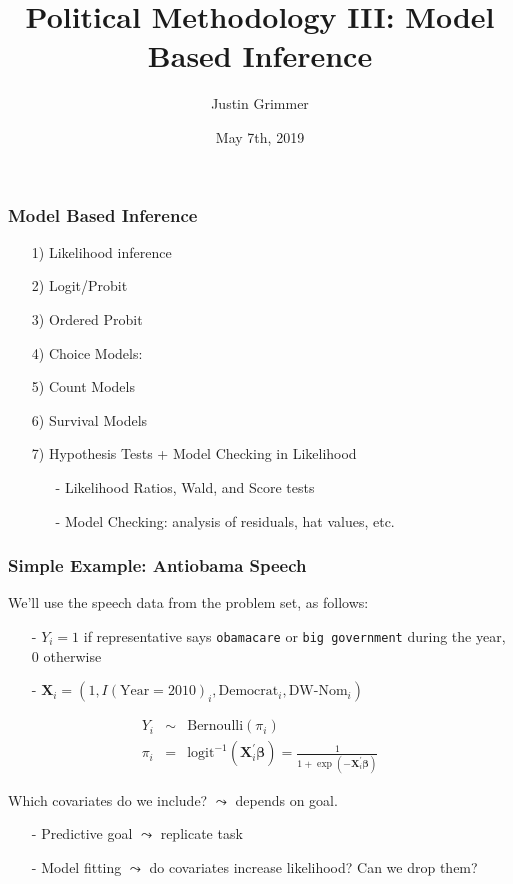 \documentclass{beamer}
\title[Methodology III] %
{Political Methodology III: Model Based Inference}
\author{Justin Grimmer}
\institute[Stanford University]{Professor\\Department of Political Science \\  Stanford University}
\date{May 7th, 2019}
\begin{document}
\begin{frame}
\titlepage
\end{frame}


\begin{frame}
\frametitle{Model Based Inference}

\begin{itemize}
\item[1)] Likelihood inference
\item[2)] Logit/Probit
\item[3)] Ordered Probit
\item[4)] Choice Models:
\item[5)] Count Models
\item[6)] Survival Models
\item[7)] \alert{Hypothesis Tests + Model Checking in Likelihood}
\begin{itemize}
\item[-] Likelihood Ratios, Wald, and Score tests
\item[-] Model Checking: analysis of residuals, hat values, etc.
\end{itemize}
\end{itemize}

\end{frame}


\begin{frame}
\frametitle{Simple Example: Antiobama Speech}

We'll  use the speech data from the problem set, as follows:

\begin{itemize}
\item[-] $Y_{i} = 1 $ if representative says {\tt obamacare} or {\tt big government} during the year, 0 otherwise
\item[-] $\boldsymbol{X}_{i} = (1, I(\text{Year} = 2010)_{i}, \text{Democrat}_{i}, \text{DW-Nom}_{i}) $
\end{itemize}

\begin{eqnarray}
Y_{i}  &  \sim &   \text{Bernoulli}(\pi_{i}) \nonumber \\
\pi_{i}     & = & \text{logit}^{-1}(\boldsymbol{X}_{i}^{'} \boldsymbol{\beta})  = \frac{1}{1 + \exp(-\boldsymbol{X}_{i}^{'} \boldsymbol{\beta}) } \nonumber
\end{eqnarray}


Which covariates do we include? $\leadsto$ depends on goal.  \\
\begin{itemize}
\item[-] Predictive goal $\leadsto$ replicate task
\item[-] Model fitting $\leadsto$ do covariates increase likelihood? Can we drop them?
\end{itemize}

\end{frame}
\end{document}
